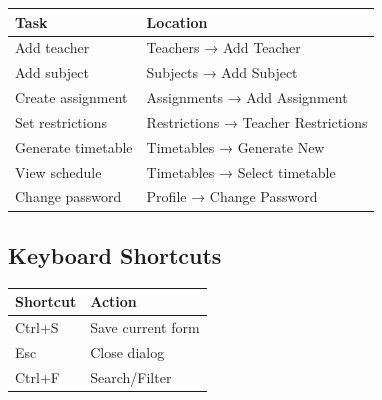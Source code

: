 \documentclass[12pt,a4paper]{article}
\begin{document}
\begin{tabular}{@{}ll@{}}
\toprule
\textbf{Task} & \textbf{Location} \\ \midrule
Add teacher & Teachers → Add Teacher \\
Add subject & Subjects → Add Subject \\
Create assignment & Assignments → Add Assignment \\
Set restrictions & Restrictions → Teacher Restrictions \\
Generate timetable & Timetables → Generate New \\
View schedule & Timetables → Select timetable \\
Change password & Profile → Change Password \\
\bottomrule
\end{tabular}

\subsection{Keyboard Shortcuts}

\begin{tabular}{@{}ll@{}}
\toprule
\textbf{Shortcut} & \textbf{Action} \\ \midrule
Ctrl+S & Save current form \\
Esc & Close dialog \\
Ctrl+F & Search/Filter \\
\bottomrule
\end{tabular}
\end{document}
